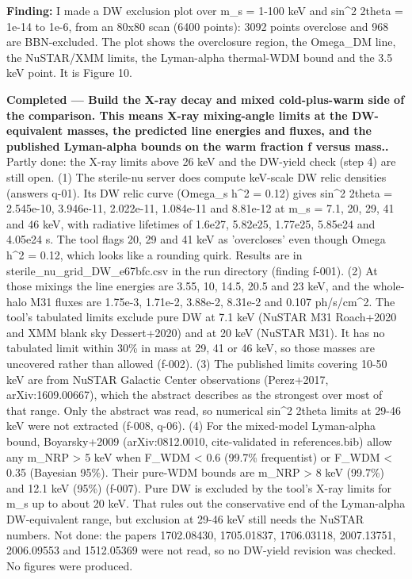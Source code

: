 \documentclass[11pt,a4paper]{article}
\begin{document}
\textbf{Finding:} I made a DW exclusion plot over m\_s = 1-100 keV and sin\textasciicircum{}2 2theta = 1e-14 to 1e-6, from an 80x80 scan (6400 points): 3092 points overclose and 968 are BBN-excluded. The plot shows the overclosure region, the Omega\_DM line, the NuSTAR/XMM limits, the Lyman-alpha thermal-WDM bound and the 3.5 keV point. It is Figure 10.

\textbf{Completed --- Build the X-ray decay and mixed cold-plus-warm side of the comparison. This means X-ray mixing-angle limits at the DW-equivalent masses, the predicted line energies and fluxes, and the published Lyman-alpha bounds on the warm fraction f versus mass..} Partly done: the X-ray limits above 26 keV and the DW-yield check (step 4) are still open. (1) The sterile-nu server does compute keV-scale DW relic densities (answers q-01). Its DW relic curve (Omega\_s h\textasciicircum{}2 = 0.12) gives sin\textasciicircum{}2 2theta = 2.545e-10, 3.946e-11, 2.022e-11, 1.084e-11 and 8.81e-12 at m\_s = 7.1, 20, 29, 41 and 46 keV, with radiative lifetimes of 1.6e27, 5.82e25, 1.77e25, 5.85e24 and 4.05e24 s. The tool flags 20, 29 and 41 keV as 'overcloses' even though Omega h\textasciicircum{}2 = 0.12, which looks like a rounding quirk. Results are in sterile\_nu\_grid\_DW\_e67bfc.csv in the run directory (finding f-001). (2) At those mixings the line energies are 3.55, 10, 14.5, 20.5 and 23 keV, and the whole-halo M31 fluxes are 1.75e-3, 1.71e-2, 3.88e-2, 8.31e-2 and 0.107 ph/s/cm\textasciicircum{}2. The tool's tabulated limits exclude pure DW at 7.1 keV (NuSTAR M31 Roach+2020 and XMM blank sky Dessert+2020) and at 20 keV (NuSTAR M31). It has no tabulated limit within 30\% in mass at 29, 41 or 46 keV, so those masses are uncovered rather than allowed (f-002). (3) The published limits covering 10-50 keV are from NuSTAR Galactic Center observations (Perez+2017, arXiv:1609.00667), which the abstract describes as the strongest over most of that range. Only the abstract was read, so numerical sin\textasciicircum{}2 2theta limits at 29-46 keV were not extracted (f-008, q-06). (4) For the mixed-model Lyman-alpha bound, Boyarsky+2009 (arXiv:0812.0010, cite-validated in references.bib) allow any m\_NRP \textgreater{} 5 keV when F\_WDM \textless{} 0.6 (99.7\% frequentist) or F\_WDM \textless{} 0.35 (Bayesian 95\%). Their pure-WDM bounds are m\_NRP \textgreater{} 8 keV (99.7\%) and 12.1 keV (95\%) (f-007). Pure DW is excluded by the tool's X-ray limits for m\_s up to about 20 keV. That rules out the conservative end of the Lyman-alpha DW-equivalent range, but exclusion at 29-46 keV still needs the NuSTAR numbers. Not done: the papers 1702.08430, 1705.01837, 1706.03118, 2007.13751, 2006.09553 and 1512.05369 were not read, so no DW-yield revision was checked. No figures were produced.
\end{document}
